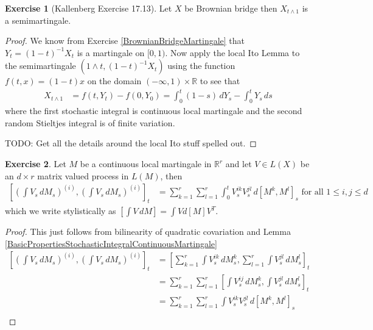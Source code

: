 \documentclass{amsbook}
\theoremstyle{definition}
\newtheorem{xca}{Exercise}
\theoremstyle{remark}
\newcommand{\reals}{\mathbb{R}}
\begin{document}
\begin{xca}[Kallenberg Exercise 17.13]Let $X$ be Brownian bridge then
  $X_{t \wedge 1}$ is a semimartingale.
\end{xca}
\begin{proof}
We know from Exercise \ref{BrownianBridgeMartingale} that
$Y_t = (1-t)^{-1}X_t$ is a martingale on $[0,1)$.  Now apply the local Ito
Lemma to the semimartingale $(1 \wedge t ,(1-t)^{-1}X_t)$ using the
function $f(t,x) = (1-t) x$ on the domain $(-\infty,1) \times \reals$ to see that
\begin{align*}
X_{t \wedge 1} &= f(t,Y_t) - f(0,Y_0) = 
\int_0^t (1-s) \, dY_s -\int_0^t Y_s \, ds
\end{align*}
where the first stochastic integral is continuous local martingale and the second random Stieltjes integral is of finite variation.

TODO: Get all the details around the local Ito stuff spelled out.
\end{proof}

\begin{xca}\label{QuadraticCovariationMatrixVectorStochasticIntegral}Let
  $M$ be a continuous local martingale in $\reals^r$ and let $V \in L(X)$ be an $d
  \times r$ matrix valued process in $L(M)$, then 
\begin{align*}
\left[ \left(\int V_s \, dM_s \right)^{(i)},  \left(\int V_s \, dM_s
  \right)^{(i)} \right]_t &= \sum_{k=1}^r \sum_{l=1}^r \int_0^t
                            V^{ik}_s V^{jl}_s \, d[M^k,M^l]_s \text{ for all
                            $1 \leq i,j \leq d$}
\end{align*}
which we write stylistically as $[\int V \, dM] = \int V d[M] V^T$.
\end{xca}
\begin{proof}
This just follows from bilinearity of quadratic covariation and Lemma \ref{BasicPropertiesStochasticIntegralContinuousMartingale}
\begin{align*}
\left[ \left(\int V_s \, dM_s \right)^{(i)},  \left(\int V_s \, dM_s
  \right)^{(i)} \right]_t 
&= \left[ 
\sum_{k=1}^r \int V^{ik}_s \,dM^{k}_s, 
\sum_{l=1}^r \int V^{jl}_s \,dM^{l}_s 
\right]_t \\
&=\sum_{k=1}^r \sum_{l=1}^r \left[ \int V^{ij}_s \,dM^{k}_s, \int V^{jl}_s \,dM^l_s \right]_t \\
&=\sum_{k=1}^r \sum_{l=1}^r \int V^{ik}_s V^{jl}_s \, d[ M^{k}, M^l ]_s \\
\end{align*}
\end{proof}
\end{document}

